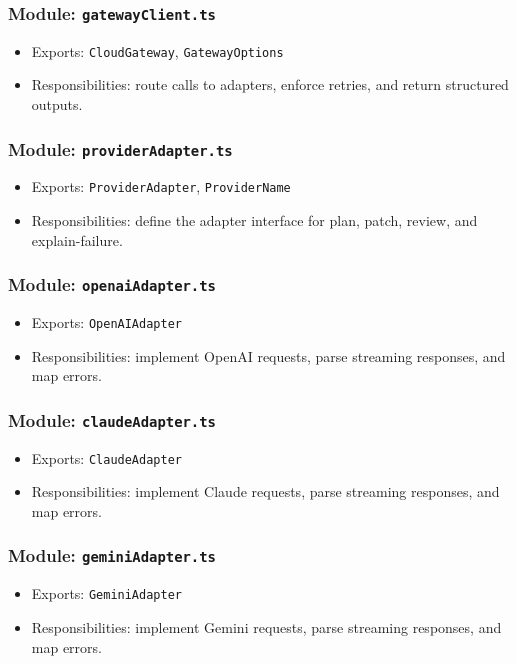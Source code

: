 \documentclass[11pt]{article}
\begin{document}
\subsubsection*{Module: \texttt{gatewayClient.ts}}
\begin{itemize}[noitemsep]
  \item Exports: \texttt{CloudGateway}, \texttt{GatewayOptions}
  \item Responsibilities: route calls to adapters, enforce retries, and return structured outputs.
\end{itemize}

\subsubsection*{Module: \texttt{providerAdapter.ts}}
\begin{itemize}[noitemsep]
  \item Exports: \texttt{ProviderAdapter}, \texttt{ProviderName}
  \item Responsibilities: define the adapter interface for plan, patch, review, and explain-failure.
\end{itemize}

\subsubsection*{Module: \texttt{openaiAdapter.ts}}
\begin{itemize}[noitemsep]
  \item Exports: \texttt{OpenAIAdapter}
  \item Responsibilities: implement OpenAI requests, parse streaming responses, and map errors.
\end{itemize}

\subsubsection*{Module: \texttt{claudeAdapter.ts}}
\begin{itemize}[noitemsep]
  \item Exports: \texttt{ClaudeAdapter}
  \item Responsibilities: implement Claude requests, parse streaming responses, and map errors.
\end{itemize}

\subsubsection*{Module: \texttt{geminiAdapter.ts}}
\begin{itemize}[noitemsep]
  \item Exports: \texttt{GeminiAdapter}
  \item Responsibilities: implement Gemini requests, parse streaming responses, and map errors.
\end{itemize}
\end{document}
